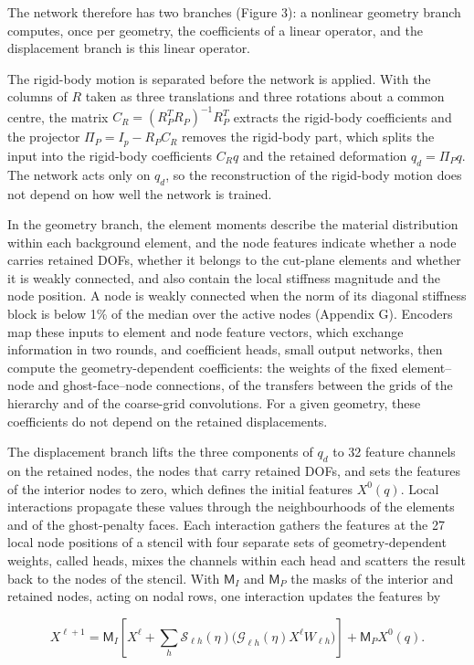 \documentclass[preprint,12pt,authoryear]{elsarticle}
\begin{document}
The network therefore has two branches (Figure 3): a nonlinear geometry branch computes, once per geometry, the coefficients of a linear operator, and the displacement branch is this linear operator.

The rigid-body motion is separated before the network is applied. With the columns of \(R\) taken as three translations and three rotations about a common centre, the matrix \(C_R=(R_P^TR_P)^{-1}R_P^T\) extracts the rigid-body coefficients and the projector \(\Pi_P=I_p-R_PC_R\) removes the rigid-body part, which splits the input into the rigid-body coefficients \(C_Rq\) and the retained deformation \(q_d=\Pi_Pq\). The network acts only on \(q_d\), so the reconstruction of the rigid-body motion does not depend on how well the network is trained.

In the geometry branch, the element moments describe the material distribution within each background element, and the node features indicate whether a node carries retained DOFs, whether it belongs to the cut-plane elements and whether it is weakly connected, and also contain the local stiffness magnitude and the node position. A node is weakly connected when the norm of its diagonal stiffness block is below 1\% of the median over the active nodes (Appendix G). Encoders map these inputs to element and node feature vectors, which exchange information in two rounds, and coefficient heads, small output networks, then compute the geometry-dependent coefficients: the weights of the fixed element--node and ghost-face--node connections, of the transfers between the grids of the hierarchy and of the coarse-grid convolutions. For a given geometry, these coefficients do not depend on the retained displacements.

The displacement branch lifts the three components of \(q_d\) to 32 feature channels on the retained nodes, the nodes that carry retained DOFs, and sets the features of the interior nodes to zero, which defines the initial features \(X^0(q)\). Local interactions propagate these values through the neighbourhoods of the elements and of the ghost-penalty faces. Each interaction gathers the features at the 27 local node positions of a stencil with four separate sets of geometry-dependent weights, called heads, mixes the channels within each head and scatters the result back to the nodes of the stencil. With \(\mathsf M_I\) and \(\mathsf M_P\) the masks of the interior and retained nodes, acting on nodal rows, one interaction updates the features by

\[
X^{\ell+1}=\mathsf M_I\left[X^\ell+
 \sum_h\mathcal S_{\ell h}(\eta)
   \big(\mathcal G_{\ell h}(\eta)X^\ell W_{\ell h}\big)\right]
 +\mathsf M_PX^0(q).
\tag{8}
\]
\end{document}
